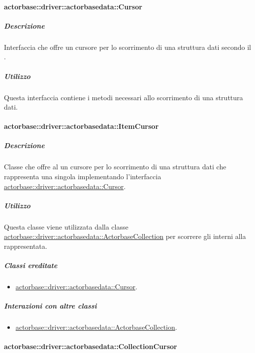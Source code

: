 \documentclass{scalatekids-article}
\begin{document}
\paragraph{actorbase::driver::actorbasedata::Cursor}
\label{sec:actorbase::driver::actorbasedata::Cursor}

\subparagraph{Descrizione}

Interfaccia che offre un cursore per lo scorrimento di una struttura dati
secondo il  .

\subparagraph{Utilizzo}

Questa interfaccia contiene i metodi necessari allo scorrimento di una
struttura dati.

\paragraph{actorbase::driver::actorbasedata::ItemCursor}
\label{sec:actorbase::driver::actorbasedata::ItemCursor}

\subparagraph{Descrizione}

Classe che offre al  un cursore per lo scorrimento di una struttura dati
che rappresenta una singola  implementando l'interfaccia
\hyperref[sec:actorbase::driver::actorbasedata::Cursor]{actorbase::driver::actorbasedata::Cursor}.

\subparagraph{Utilizzo}

Questa classe viene utilizzata dalla classe
\hyperref[sec:actorbase::driver::actorbasedata::ActorbaseCollection]{actorbase::driver::actorbasedata::ActorbaseCollection}
per scorrere gli  interni alla 
rappresentata.

\subparagraph{Classi ereditate}

\begin{itemize}
\item \hyperref[sec:actorbase::driver::actorbasedata::Cursor]{actorbase::driver::actorbasedata::Cursor}.
\end{itemize}

\subparagraph{Interazioni con altre classi}

\begin{itemize}
\item \hyperref[sec:actorbase::driver::actorbasedata::ActorbaseCollection]{actorbase::driver::actorbasedata::ActorbaseCollection}.
\end{itemize}

\paragraph{actorbase::driver::actorbasedata::CollectionCursor}
\label{sec:actorbase::driver::actorbasedata::CollectionCursor}
\end{document}
